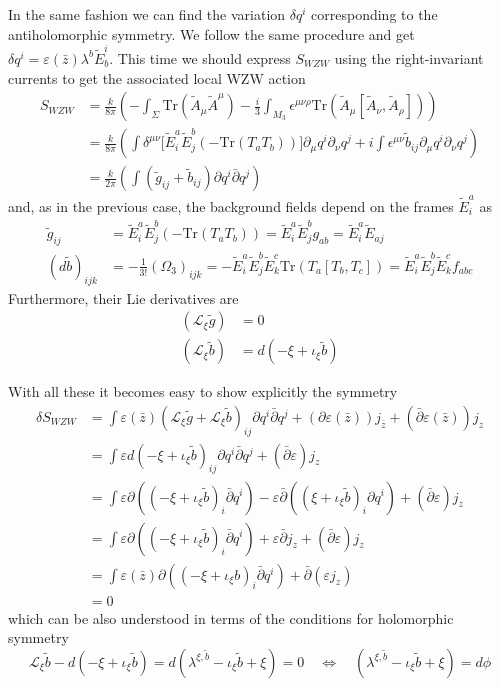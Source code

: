 \documentclass[a4paper,12pt]{article}
\numberwithin{equation}{section}
\numberwithin{thm}{section}
\numberwithin{exm}{section}
\newcommand{\p}{\partial}
\newcommand{\pb}{\bar\partial}
\newcommand{\lag}{\mathcal L}
\newcommand{\tr}{\mathrm{Tr}}
\newcommand{\wt}{\widetilde}
\newcommand{\zb}{{\bar z}}
\newcommand{\<}{{\langle}}
\renewcommand{\>}{{\rangle}}
\renewcommand{\d}{{\delta}}
\newcommand{\e}{{\epsilon}}
\newcommand{\ve}{{\varepsilon}}
\renewcommand{\i}{{\iota}}
\renewcommand{\l}{{\lambda}}
\newcommand{\m}{{\mu}}
\newcommand{\n}{{\nu}}
\newcommand{\Om}{{\Omega}}
\renewcommand{\r}{{\rho}}
\renewcommand{\S}{{\Sigma}}
\begin{document}
In the same fashion we can find the variation $\d q^i$ corresponding to the antiholomorphic symmetry. We follow the same procedure and get $\d q^i = \ve(\zb)\l^b\wt{E}^i_b$. This time we should express $S_{WZW}$ using the right-invariant currents to get the associated local WZW action
	\begin{align}
	S_{WZW} & = \frac{k}{8\pi}\left( -\int_\S \tr(\wt A_\m \wt A^\m) - \frac{i}{3} \int_{M_3} \e^{\m\n\r}\tr(\wt A_\m[\wt A_\n, \wt A_\r]) \right) \nonumber \\
	& = \frac{k}{8\pi}\left(\int\d^{\m\n}\Big[\wt E_i^a \wt E_j^b (-\tr (T_a T_b))\Big]\p_\m q^i\p_\n q^j + i \int \e^{\m\n}\wt b_{ij}\p_\m q^i\p_\n q^j \right) \nonumber \\
	& = \frac{k}{2\pi}\left(\int (\wt g_{ij} + \wt b_{ij})\p q^i\pb q^j \right)
	\end{align}
and, as in the previous case, the background fields depend on the frames $\wt E^a_i$ as
	\begin{align}
	\wt g_{ij} & = \wt E^a_i \wt E^b_j (-\tr(T_a T_b)) = \wt E^a_i \wt E^b_j g_{ab} = \wt E^a_i \wt E_{aj} \\
	(d\wt b)_{ijk} & = - \frac{1}{3!}(\Om_3)_{ijk} = - \wt E^a_i \wt E^b_j \wt E^c_k \tr(T_a[T_b,T_c]) = \wt E^a_i \wt E^b_j \wt E^c_k f_{abc}
	\end{align}
Furthermore, their Lie derivatives are
	\begin{align}
	(\lag_\xi \wt g) & = 0 \\
	(\lag_\xi \wt b) & = d(-\xi + \i_\xi \wt b)
	\end{align}

With all these it becomes easy to show explicitly the symmetry
	\begin{align}
	\d S_{WZW} & = \int \ve(\zb)(\lag_\xi \wt g + \lag_\xi \wt b)_{ij}\p q^i\pb q^j + (\p\ve(\zb)) j_\zb + (\pb\ve(\zb)) j_z \nonumber \\
	& = \int \ve d(- \xi + \i_\xi \wt b)_{ij}\p q^i\pb q^j + (\pb\ve) j_z \nonumber \\
	& = \int \ve \p((-\xi + \i_\xi\wt b)_i \pb q^i) - \ve\pb((\xi + \i_\xi\wt b)_i \p q^i) + (\pb\ve) j_z \nonumber \\
	& = \int \ve \p((-\xi + \i_\xi\wt b)_i \pb q^i) + \ve \pb j_z + (\pb\ve) j_z \nonumber \\
	& = \int \ve(\zb) \p((-\xi + \i_\xi b)_i \pb q^i) + \pb (\ve j_z) \nonumber \\
	& = 0
	\end{align}
which can be also understood in terms of the conditions for holomorphic symmetry
	\begin{equation}
	\lag_\xi\wt b - d(-\xi + \i_\xi\wt b) = d(\l^{\xi,\wt b} - \i_\xi\wt b + \xi) = 0 \quad\Leftrightarrow\quad (\l^{\xi,\wt b} - \i_\xi\wt b + \xi) = d\phi
	\end{equation}
\end{document}
